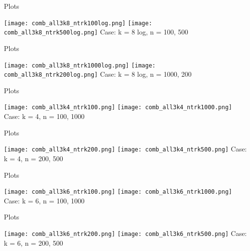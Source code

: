 \documentclass[aspectratio=169,compress,10pt]{beamer} %
\begin{document}
\begin{frame}{Plots}
\begin{adjustwidth}{-2em}{-2em}
\texttt{[image: comb\_all3k8\_ntrk100log.png]}
\texttt{[image: comb\_all3k8\_ntrk500log.png]}
Case: k = 8 log, n = 100, 500
\end{adjustwidth}
\end{frame}

\begin{frame}{Plots}
\begin{adjustwidth}{-2em}{-2em}
\texttt{[image: comb\_all3k8\_ntrk1000log.png]}
\texttt{[image: comb\_all3k8\_ntrk200log.png]}
Case: k = 8 log, n = 1000, 200
\end{adjustwidth}
\end{frame}

\begin{frame}{Plots}
\begin{adjustwidth}{-2em}{-2em}
\texttt{[image: comb\_all3k4\_ntrk100.png]}
\texttt{[image: comb\_all3k4\_ntrk1000.png]}
Case: k = 4, n = 100, 1000
\end{adjustwidth}
\end{frame}

\begin{frame}{Plots}
\begin{adjustwidth}{-2em}{-2em}
\texttt{[image: comb\_all3k4\_ntrk200.png]}
\texttt{[image: comb\_all3k4\_ntrk500.png]}
Case: k = 4, n = 200, 500
\end{adjustwidth}
\end{frame}

\begin{frame}{Plots}
\begin{adjustwidth}{-2em}{-2em}
\texttt{[image: comb\_all3k6\_ntrk100.png]}
\texttt{[image: comb\_all3k6\_ntrk1000.png]}
Case: k = 6, n = 100, 1000
\end{adjustwidth}
\end{frame}

\begin{frame}{Plots}
\begin{adjustwidth}{-2em}{-2em}
\texttt{[image: comb\_all3k6\_ntrk200.png]}
\texttt{[image: comb\_all3k6\_ntrk500.png]}
Case: k = 6, n = 200, 500
\end{adjustwidth}
\end{frame}
\end{document}
